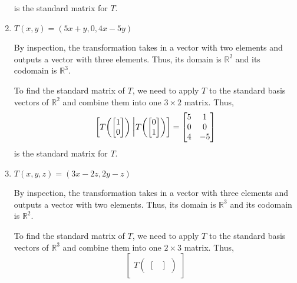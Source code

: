 \documentclass{article}
\begin{document}
\begin{enumerate}
\begin{solution}
\[        \] is the standard matrix for \(T\).
    \end{solution}
    \item \(T(x,y) = (5x+y,0,4x-5y)\)\begin{solution}
        By inspection, the transformation takes in a vector with two elements and outputs a vector with three elements. Thus, its domain is \(\mathbb{R}^2\) and its codomain is \(\mathbb{R}^3\).\par
        To find the standard matrix of \(T\), we need to apply \(T\) to the standard basis vectors of \(\mathbb{R}^2\) and combine them into one \(3\times 2\) matrix. Thus,\[
            \begin{bmatrix}
                T\!\begin{pmatrix}
                    \begin{bmatrix}
                        1\\0
                    \end{bmatrix}
                \end{pmatrix}\scalebox{1.3}{\Big|}T\!\begin{pmatrix}
                    \begin{bmatrix}
                        0\\1
                    \end{bmatrix}
                \end{pmatrix} 
            \end{bmatrix} = \begin{bmatrix}
                5&1\\0&0\\4&-5
            \end{bmatrix}
        \] is the standard matrix for \(T\).
    \end{solution}
    \item \(T(x,y,z) = (3x-2z,2y-z)\)\begin{solution}
        By inspection, the transformation takes in a vector with three elements and outputs a vector with two elements. Thus, its domain is \(\mathbb{R}^3\) and its codomain is \(\mathbb{R}^2\).\par
        To find the standard matrix of \(T\), we need to apply \(T\) to the standard basis vectors of \(\mathbb{R}^3\) and combine them into one \(2\times 3\) matrix. Thus,\[
            \begin{bmatrix}
                T\!\begin{pmatrix}
                    \begin{bmatrix}

\end{bmatrix}
\end{pmatrix}
\end{bmatrix}\]
\end{solution}
\end{enumerate}
\end{document}
